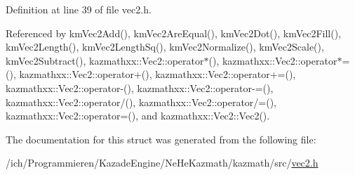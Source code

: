 Definition at line 39 of file vec2.h.

Referenced by kmVec2Add(), kmVec2AreEqual(), kmVec2Dot(), kmVec2Fill(), kmVec2Length(), kmVec2LengthSq(), kmVec2Normalize(), kmVec2Scale(), kmVec2Subtract(), kazmathxx::Vec2::operator$\ast$(), kazmathxx::Vec2::operator$\ast$=(), kazmathxx::Vec2::operator+(), kazmathxx::Vec2::operator+=(), kazmathxx::Vec2::operator-(), kazmathxx::Vec2::operator-=(), kazmathxx::Vec2::operator/(), kazmathxx::Vec2::operator/=(), kazmathxx::Vec2::operator=(), and kazmathxx::Vec2::Vec2().

The documentation for this struct was generated from the following file:\begin{CompactItemize}
\item 
/ich/Programmieren/KazadeEngine/NeHeKazmath/kazmath/src/\hyperlink{vec2_8h}{vec2.h}\end{CompactItemize}
